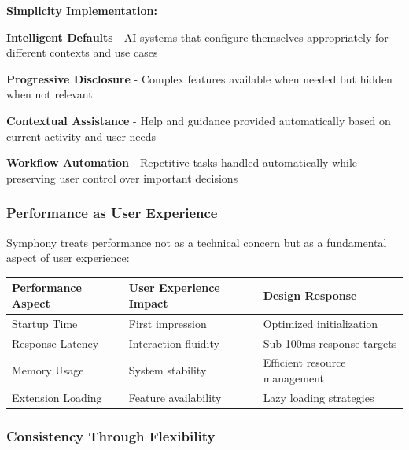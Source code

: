 \textbf{Simplicity Implementation:}

\begin{expandedlist}
    \item \textbf{Intelligent Defaults} - AI systems that configure themselves appropriately for different contexts and use cases
    
    \item \textbf{Progressive Disclosure} - Complex features available when needed but hidden when not relevant
    
    \item \textbf{Contextual Assistance} - Help and guidance provided automatically based on current activity and user needs
    
    \item \textbf{Workflow Automation} - Repetitive tasks handled automatically while preserving user control over important decisions
\end{expandedlist}

\subsubsection{Performance as User Experience}

Symphony treats performance not as a technical concern but as a fundamental aspect of user experience:

\begin{center}
\begin{tabular}{@{}lll@{}}
\toprule
\textbf{Performance Aspect} & \textbf{User Experience Impact} & \textbf{Design Response} \\
\midrule
Startup Time & First impression & Optimized initialization \\
Response Latency & Interaction fluidity & Sub-100ms response targets \\
Memory Usage & System stability & Efficient resource management \\
Extension Loading & Feature availability & Lazy loading strategies \\
\bottomrule
\end{tabular}
\label{tab:performance-ux}
\end{center}

\subsubsection{Consistency Through Flexibility}

